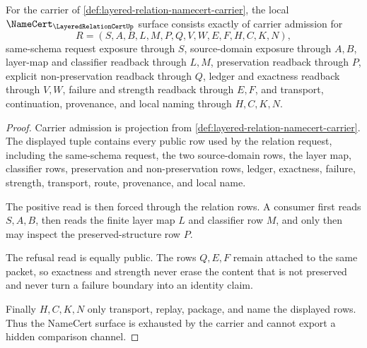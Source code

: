 \begin{theorem}
\label{thm:layered-relation-namecert-surface}
For the carrier of \autoref{def:layered-relation-namecert-carrier}, the local $\NameCert_{\LayeredRelationCertUp}$ surface consists exactly of carrier admission for
$$
R=(S,A,B,L,M,P,Q,V,W,E,F,H,C,K,N),
$$
same-schema request exposure through $S$, source-domain exposure through $A,B$, layer-map and classifier readback through $L,M$, preservation readback through $P$, explicit non-preservation readback through $Q$, ledger and exactness readback through $V,W$, failure and strength readback through $E,F$, and transport, continuation, provenance, and local naming through $H,C,K,N$.
\end{theorem}
\begin{proof}
Carrier admission is projection from \autoref{def:layered-relation-namecert-carrier}. The displayed tuple contains every public row used by the relation request, including the same-schema request, the two source-domain rows, the layer map, classifier rows, preservation and non-preservation rows, ledger, exactness, failure, strength, transport, route, provenance, and local name.

The positive read is then forced through the relation rows. A consumer first reads $S,A,B$, then reads the finite layer map $L$ and classifier row $M$, and only then may inspect the preserved-structure row $P$.

The refusal read is equally public. The rows $Q,E,F$ remain attached to the same packet, so exactness and strength never erase the content that is not preserved and never turn a failure boundary into an identity claim.

Finally $H,C,K,N$ only transport, replay, package, and name the displayed rows. Thus the NameCert surface is exhausted by the carrier and cannot export a hidden comparison channel.
\end{proof}

